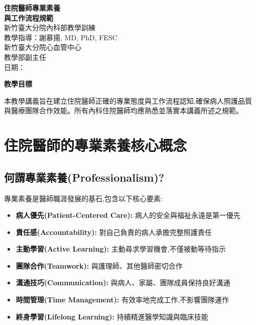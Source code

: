 \documentclass[12pt,a4paper]{article}
\newcommand{\mydate}{\DTMtoday}
\begin{document}
\begin{center}
{\Huge\textcolor{emergency_red}{\textbf{住院醫師專業素養}}} \\[10pt]
{\Huge\textcolor{emergency_red}{\textbf{與工作流程規範}}} \\[15pt]
{\Large\textcolor{emergency_blue}{新竹臺大分院內科部教學訓練}} \\[20pt]
{\large 教學指導：謝慕揚, MD, PhD, FESC} \\[5pt]
{\large 新竹臺大分院心血管中心} \\[5pt]
{\large 教學部副主任} \\[20pt]
{\normalsize 日期：\mydate}
\end{center}

\vspace{1cm}

\begin{importantbox}
\textbf{教學目標}

本教學講義旨在建立住院醫師正確的專業態度與工作流程認知,確保病人照護品質與醫療團隊合作效能。所有內科住院醫師均應熟悉並落實本講義所述之規範。
\end{importantbox}

\newpage

\section{住院醫師的專業素養核心概念}

\subsection{何謂專業素養(Professionalism)?}

專業素養是醫師職涯發展的基石,包含以下核心要素:

\begin{itemize}[leftmargin=*]
\item \textbf{病人優先(Patient-Centered Care):} 病人的安全與福祉永遠是第一優先
\item \textbf{責任感(Accountability):} 對自己負責的病人承擔完整照護責任
\item \textbf{主動學習(Active Learning):} 主動尋求學習機會,不僅被動等待指示
\item \textbf{團隊合作(Teamwork):} 與護理師、其他醫師密切合作
\item \textbf{溝通技巧(Communication):} 與病人、家屬、團隊成員保持良好溝通
\item \textbf{時間管理(Time Management):} 有效率地完成工作,不影響團隊運作
\item \textbf{終身學習(Lifelong Learning):} 持續精進醫學知識與臨床技能
\end{itemize}
\end{document}
